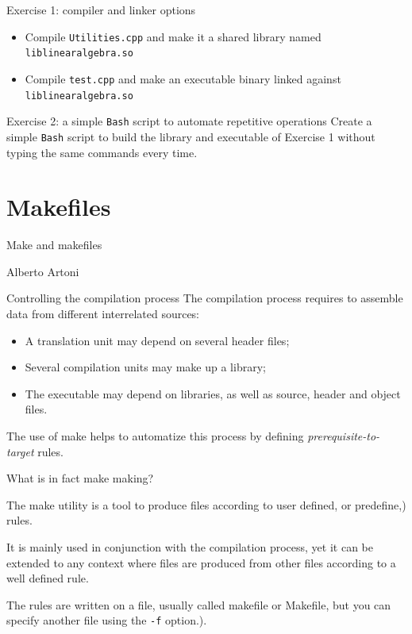 \documentclass[10pt,aspectratio=169]{beamer}
\newcommand{\blue}{\color{blue}}
\begin{document}
\begin{frame}{Exercise 1: compiler and linker options}
  \begin{itemize}
  \item Compile \texttt{Utilities.cpp} and make it a shared library named \texttt{liblinearalgebra.so}\\[5mm]
  \item Compile \texttt{test.cpp} and make an executable binary linked against \texttt{liblinearalgebra.so}
  \end{itemize}
\end{frame}

\begin{frame}{Exercise 2: a simple \texttt{Bash} script to automate repetitive operations}
  Create a simple \texttt{Bash} script to build the library and executable of Exercise 1 without typing the same commands every time.
\end{frame}

\section*{Makefiles}

\begin{frame}
\centering
{ \huge Make and makefiles}\\

\vspace{1cm}

\large Alberto Artoni
\end{frame}

\begin{frame}{Controlling the compilation process}
The compilation process requires to assemble data from different interrelated sources:
\smallskip

\begin{itemize}
\item A translation unit may depend on several header files; 
\item Several compilation units may make up a library;
\item The executable may depend on libraries, as well as source, header and object files.
\end{itemize}

The use of \alert{make} helps to automatize this process by defining
\emph{prerequisite-to-target} rules.
\end{frame}


\begin{frame}{What is in fact make making?}

  The \alert{make} utility is a tool to produce files according to user
  defined, or predefine,) rules.  \medskip

  It is mainly used in conjunction with the \alert{compilation process},
  yet it can be extended to any context where files are produced from
  other files according to a well defined rule.  \medskip

  The rules are written on a file, usually called {\blue makefile} or
  {\blue Makefile}, but you can specify another file using the \texttt{-f} option.).  
\end{frame}
\end{document}
